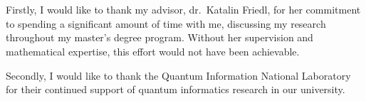 \chapter*{\koszonetnyilvanitas}

Firstly, I would like to thank my advisor, dr.~Katalin Friedl, for her commitment to spending a significant amount of time with me, discussing my research throughout my master's degree program. Without her supervision and mathematical expertise, this effort would not have been achievable.

Secondly, I would like to thank the Quantum Information National Laboratory for their continued support of quantum informatics research in our university.